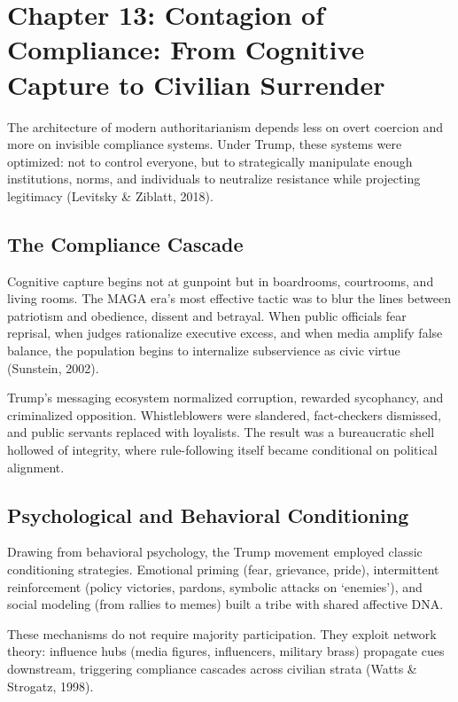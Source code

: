 \documentclass[
]{article}
\author{}
\date{}
\begin{document}
\chapter{Chapter 13: Contagion of Compliance: From Cognitive Capture to Civilian Surrender}

The architecture of modern authoritarianism depends less on overt coercion and more on invisible compliance systems. Under Trump, these systems were optimized: not to control everyone, but to strategically manipulate enough institutions, norms, and individuals to neutralize resistance while projecting legitimacy (Levitsky \& Ziblatt, 2018).

\section*{The Compliance Cascade}

Cognitive capture begins not at gunpoint but in boardrooms, courtrooms, and living rooms. The MAGA era's most effective tactic was to blur the lines between patriotism and obedience, dissent and betrayal. When public officials fear reprisal, when judges rationalize executive excess, and when media amplify false balance, the population begins to internalize subservience as civic virtue (Sunstein, 2002).

Trump's messaging ecosystem normalized corruption, rewarded sycophancy, and criminalized opposition. Whistleblowers were slandered, fact-checkers dismissed, and public servants replaced with loyalists. The result was a bureaucratic shell hollowed of integrity, where rule-following itself became conditional on political alignment.

\section*{Psychological and Behavioral Conditioning}

Drawing from behavioral psychology, the Trump movement employed classic conditioning strategies. Emotional priming (fear, grievance, pride), intermittent reinforcement (policy victories, pardons, symbolic attacks on `enemies'), and social modeling (from rallies to memes) built a tribe with shared affective DNA.

These mechanisms do not require majority participation. They exploit network theory: influence hubs (media figures, influencers, military brass) propagate cues downstream, triggering compliance cascades across civilian strata (Watts \& Strogatz, 1998).
\end{document}
